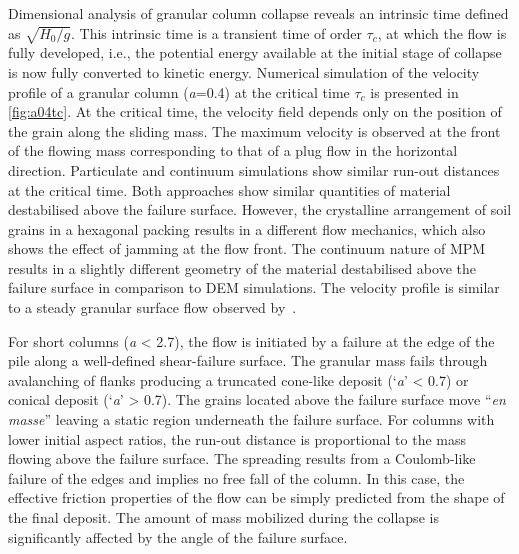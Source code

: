 Dimensional analysis of granular column collapse reveals an intrinsic time 
defined as $\sqrt{H_{0}/g}$. This intrinsic time is a transient time 
of order $\tau_{c}$, at which the flow is fully developed, i.e., the potential 
energy available at the initial stage of collapse is now fully converted to 
kinetic energy. Numerical simulation of the velocity profile of a granular 
column (\textit{a}=0.4) at the critical time $\tau_{c}$ is presented in 
\cref{fig:a04tc}. At the critical time, the velocity field depends only on the 
position of the grain along the sliding mass. The maximum velocity is observed 
at the front of the flowing mass corresponding to that of a plug flow in the 
horizontal direction. Particulate and continuum simulations show similar 
run-out distances at the critical time. Both approaches show similar quantities 
of material 
destabilised above the failure surface. However, the crystalline arrangement of 
soil grains in a hexagonal packing results in a different flow mechanics, which 
also shows the effect of jamming at the flow front. The continuum nature of MPM 
results in a slightly different geometry of the material destabilised above the 
failure surface in comparison to DEM simulations. The velocity profile is 
similar to a steady granular surface flow observed by~\citet{Lajeunesse2004}. 


For short columns (\textit{a} < 2.7), the flow is initiated 
by a failure at the edge of the pile along a well-defined shear-failure surface.
The granular mass fails through avalanching of flanks producing a 
truncated cone-like deposit (`\textit{a}' < 0.7) or conical deposit 
(`\textit{a}' > 0.7). The grains located above the failure surface move 
``\textit{en masse}'' leaving a static region underneath the failure surface. 
For columns with lower initial aspect ratios, the run-out distance is 
proportional to the mass flowing above the failure surface. The spreading 
results from a Coulomb-like failure of the edges and implies no free fall of 
the column. In this case, the effective friction 
properties of the flow can be simply predicted from the shape of the final 
deposit. The amount of mass mobilized during the collapse is significantly 
affected by the angle of the failure surface.

